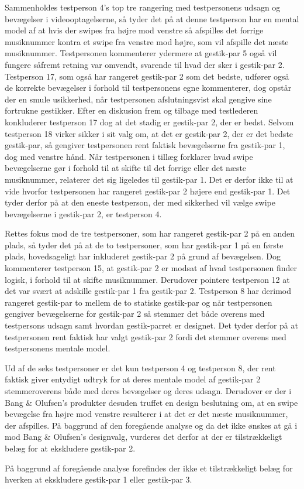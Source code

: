 Sammenholdes testperson 4's top tre rangering med testpersonens udsagn og bevægelser i videooptagelserne, så tyder det på at denne testperson har en mental model af at hvis der swipes fra højre mod venstre så afspilles det forrige musiknummer kontra et swipe fra venstre mod højre, som vil afspille det næste musiknummer. Testpersonen kommenterer ydermere at gestik-par 5 også vil fungere såfremt retning var omvendt, svarende til hvad der sker i gestik-par 2. Testperson 17, som også har rangeret gestik-par 2 som det bedste, udfører også de korrekte bevægelser i forhold til testpersonens egne kommenterer, dog opstår der en smule usikkerhed, når testpersonen afslutningsvist skal gengive sine fortrukne gestikker. Efter en diskusion frem og tilbage med testlederen konkluderer testperson 17 dog at det stadig er gestik-par 2, der er bedst. Selvom testperson 18 virker sikker i sit valg om, at det er gestik-par 2, der er det bedste gestik-par, så gengiver testpersonen rent faktisk bevægelserne fra gestik-par 1, dog med venstre hånd. Når testpersonen i tillæg forklarer hvad swipe bevægelserne gør i forhold til at skifte til det forrige eller det næste musiknummer, relaterer det sig ligeledes til gestik-par 1. Det er derfor ikke til at vide hvorfor testpersonen har rangeret gestik-par 2 højere end gestik-par 1. Det tyder derfor på at den eneste testperson, der med sikkerhed vil vælge swipe bevægelserne i gestik-par 2, er testperson 4. 

Rettes fokus mod de tre testpersoner, som har rangeret gestik-par 2 på en anden plads, så tyder det på at de to testpersoner, som har gestik-par 1 på en første plads, hovedsageligt har inkluderet gestik-par 2 på grund af bevægelsen. Dog kommenterer testperson 15, at gestik-par 2 er modsat af hvad testpersonen finder logisk, i forhold til at skifte musiknummer.  Derudover pointere testperson 12 at det var svært at adskille gestik-par 1 fra gestik-par 2. Testperson 8 har derimod rangeret gestik-par to mellem de to statiske gestik-par og når testpersonen gengiver bevægelserne for gestik-par 2 så stemmer det både overens med testpersons udsagn samt hvordan gestik-parret er designet. Det tyder derfor på at testpersonen rent faktisk har valgt gestik-par 2 fordi det stemmer overens med testpersonens mentale model. 

Ud af de seks testpersoner er det kun testperson 4 og testperson 8, der rent faktisk giver entydigt udtryk for at deres mentale model af gestik-par 2 stemmeroverens både med deres bevægelser og deres udsagn. Derudover er der i Bang $\&$ Olufsen's produkter desuden truffet en design beslutning om, at en swipe bevægelse fra højre mod venstre resulterer i at det er det næste musiknummer, der afspilles. På baggrund af den foregående analyse og da det ikke ønskes at gå i mod Bang $\&$ Olufsen's designvalg, vurderes det derfor at der er tilstrækkeligt belæg for at ekskludere gestik-par 2. 

På baggrund af foregående analyse forefindes der ikke et tilstrækkeligt belæg for hverken at ekskludere gestik-par 1 eller gestik-par 3. 

